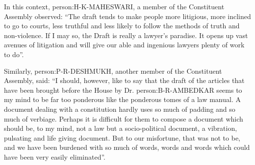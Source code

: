 \begin{multicols}{2}
In this context, \gls{person:H-K-MAHESWARI}, a member of the Constituent Assembly observed: ``The draft tends to make people more litigious, more inclined to go to courts, less truthful and less likely to follow the methods of truth and non-violence. If I may so, the Draft is really a lawyer's paradise. It opens up vast avenues of litigation and will give our able and ingenious lawyers plenty of work to do''.

Similarly, \gls{person:P-R-DESHMUKH}, another member of the Constituent Assembly, said: ``I should, however, like to say that the draft of the articles that have been brought before the House by Dr. \gls{person:B-R-AMBEDKAR} seems to my mind to be far too ponderous like the ponderous tomes of a law manual. A document dealing with a constitution hardly uses so much of padding and so much of verbiage. Perhaps it is difficult for them to compose a document which should be, to my mind, not a law but a socio-political document, a vibration, pulsating and life giving document. But to our misfortune, that was not to be, and we have been burdened with so much of words, words and words which could have been very easily eliminated''.

\end{multicols}

